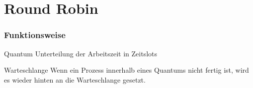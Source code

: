 \section{Round Robin}

\begin{frame}
    \frametitle{Funktionsweise}


    \begin{block}{Quantum}
        Unterteilung der Arbeitszeit in Zeitslots
    \end{block}

    \begin{block}{Warteschlange}
        Wenn ein Prozess innerhalb eines Quantums nicht fertig ist, wird es wieder hinten an die Warteschlange gesetzt.
    \end{block}

\end{frame}
